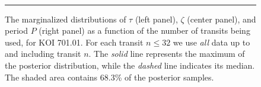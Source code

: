 

\begin{figure}[t] 
\begin{center} 
\mbox{
\quad
{}
\quad
{}
}
\caption{The marginalized distributions of $\tau$ (left panel),
  $\zeta$ (center panel), and period $P$ (right panel) as a function
  of the number of transits being used, for KOI 701.01.  For each
  transit $n \leq 32$ we use {\it all} data up to and including
  transit $n$.  The {\it solid} line
  represents the maximum of the posterior distribution, while the {\it
  dashed} line indicates its median.  The shaded area contains 68.3\%
  of the posterior samples.}
\hspace*{\fill}  
\hrule
\label{fig-marg} 
\end{center} 
\end{figure}

